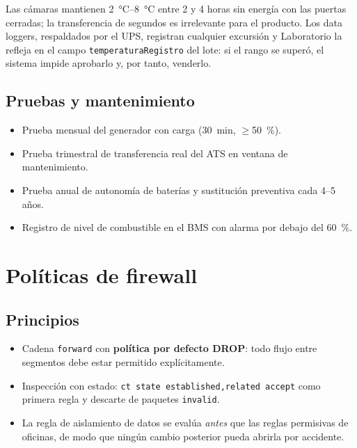\documentclass[11pt,a4paper,oneside]{report}
\newcommand{\cod}[1]{\texttt{\small #1}}
\begin{document}
\begin{tecnico}
Las cámaras mantienen \SIrange{2}{8}{\celsius} entre 2 y 4 horas sin energía con las
puertas cerradas; la transferencia de segundos es irrelevante para el producto. Los
data loggers, respaldados por el UPS, registran cualquier excursión y Laboratorio la
refleja en el campo \cod{temperaturaRegistro} del lote: si el rango se superó, el sistema
impide aprobarlo y, por tanto, venderlo.
\end{tecnico}

\section{Pruebas y mantenimiento}
\begin{itemize}
  \item Prueba mensual del generador con carga (\SI{30}{\minute}, $\geq$\SI{50}{\percent}).
  \item Prueba trimestral de transferencia real del ATS en ventana de mantenimiento.
  \item Prueba anual de autonomía de baterías y sustitución preventiva cada 4--5 años.
  \item Registro de nivel de combustible en el BMS con alarma por debajo del \SI{60}{\percent}.
\end{itemize}

\chapter{Políticas de firewall}

\section{Principios}
\begin{itemize}
  \item Cadena \cod{forward} con \textbf{política por defecto DROP}: todo flujo entre
  segmentos debe estar permitido explícitamente.
  \item Inspección con estado: \cod{ct state established,related accept} como primera regla
  y descarte de paquetes \cod{invalid}.
  \item La regla de aislamiento de datos se evalúa \emph{antes} que las reglas permisivas de
  oficinas, de modo que ningún cambio posterior pueda abrirla por accidente.
\end{itemize}
\end{document}
